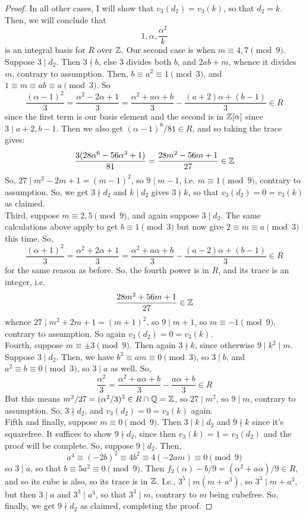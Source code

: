 \begin{proof}
    In all other cases, I will show that $v_3(d_2) = v_3(k)$, so that $d_2 = k$. Then, we will conclude that
    \[ 1,\alpha,\frac{\alpha^2}{k} \]
    is an integral basis for $R$ over $\mathbb{Z}$. Our second case is when $m \equiv 4,7 \pmod{9}$. Suppose $3 \mid d_2$. Then $3 \nmid b$, else $3$ divides both $b$, and $2ab+m$, whence it divides $m$, contrary to assumption. Then, $b \equiv a^2 \equiv 1 \pmod{3}$, and $1 \equiv m \equiv ab \equiv a \pmod{3}$. So
    \[ \frac{(\alpha-1)^2}{3} = \frac{\alpha^2-2\alpha+1}{3} = \frac{\alpha^2+a\alpha+b}{3} - \frac{(a+2)\alpha+(b-1)}{3} \in R \]
    since the first term is our basis element and the second is in $\mathbb{Z}[\alpha]$ since $3 \mid a+2,b-1$. Then we also get $(\alpha-1)^8/81 \in R$, and so taking the trace gives:
    \[ \frac{3(28\alpha^6-56\alpha^3+1)}{81} = \frac{28m^2-56m+1}{27} \in \mathbb{Z} \]
    So, $27 \mid m^2-2m+1 = (m-1)^2$, so $9 \mid m-1$, i.e. $m \equiv 1 \pmod{9}$, contrary to assumption. So, we get $3 \nmid d_2$ and $k \mid d_2$ gives $3 \nmid k$, so that $v_3(d_2) = 0 = v_3(k)$ as claimed. \\

    Third, suppose $m \equiv 2,5 \pmod{9}$, and again suppose $3 \mid d_2$. The same calculations above apply to get $b \equiv 1 \pmod{3}$ but now give $2 \equiv m \equiv a \pmod{3}$ this time. So,
    \[ \frac{(\alpha+1)^2}{3} = \frac{\alpha^2+2\alpha+1}{3} = \frac{\alpha^2+a\alpha+b}{3}-\frac{(a-2)\alpha+(b-1)}{3} \in R \]
    for the same reason as before. So, the fourth power is in $R$, and its trace is an integer, i.e.
    \[ \frac{28m^2+56m+1}{27} \in \mathbb{Z} \]
    whence $27 \mid m^2+2m+1 = (m+1)^2$, so $9 \mid m+1$, so $m \equiv -1 \pmod{9}$, contrary to assumption. So again $v_3(d_2) = 0 = v_3(k)$. \\

    Fourth, suppose $m \equiv \pm 3 \pmod{9}$. Then again $3 \nmid k$, since otherwise $9 \mid k^2 \mid m$. Suppose $3 \mid d_2$. Then, we have $b^2 \equiv am \equiv 0 \pmod{3}$, so $3 \mid b$, and $a^2 \equiv b \equiv 0 \pmod{3}$, so $3 \mid a$ as well. So,
    \[ \frac{\alpha^2}{3} = \frac{\alpha^2+a\alpha+b}{3}-\frac{a\alpha+b}{3} \in R \]
    But this means $m^2/27 = (\alpha^2/3)^3 \in R \cap \mathbb{Q} = \mathbb{Z}$, so $27 \mid m^2$, so $9 \mid m$, contrary to assumption. So, $3 \nmid d_2$, and $v_3(d_2) = 0 = v_3(k)$ again. \\

    Fifth and finally, suppose $m \equiv 0 \pmod{9}$. Then $3 \mid k \mid d_2$ and $9 \nmid k$ since it's squarefree. It suffices to show $9 \nmid d_2$, since then $v_3(k) = 1 = v_3(d_2)$ and the proof will be complete. So, suppose $9 \mid d_2$. Then,
    \[ a^4 \equiv (-2b)^2 \equiv 4b^2 \equiv 4(-2am) \equiv 0 \pmod{9} \]
    so $3 \mid a$, so that $b \equiv 5a^2 \equiv 0 \pmod{9}$. Then $f_2(\alpha)-b/9 = (\alpha^2+a\alpha)/9 \in R$, and so its cube is also, so its trace is in $\mathbb{Z}$. I.e., $3^5 \mid m(m+a^3)$, so $3^3 \mid m+a^3$, but then $3 \mid a$ and $3^3 \mid a^3$, so that $3^3 \mid m$, contrary to $m$ being cubefree. So, finally, we get $9 \nmid d_2$ as claimed, completing the proof.
\end{proof}
